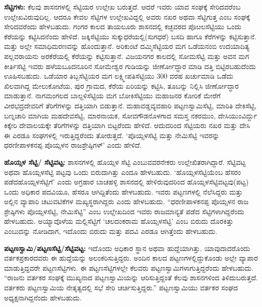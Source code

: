 \textbf{ಸೆಟ್ಟಿಗಳು:} ಕೆಲವು ಶಾಸನಗಳಲ್ಲಿ ಸೆಟ್ಟಿಯರ ಉಲ್ಲೇಖ ಬರುತ್ತದೆ. ಆದರೆ ಇವರು ಯಾವ ಸಂಘಕ್ಕೆ ಸೇರಿದವರೆಂಬ ಉಲ್ಲೇಖವಿರುವುದಿಲ್ಲ. ಆದರೂ ಕೇವಲ ಸೆಟ್ಟಿಗಳ ಉಲ್ಲೇಖವಿದ್ದಲ್ಲಿ ಅವರು ನಖರ ಅಥವಾ ಸೆಟ್ಟಿಗುತ್ತ ಎಂಬ ಸಂಘಕ್ಕೆ ಸೇರಿದವರೆಂದು ಹೇಳಬಹುದು. ಗಂಗರ ಕಾಲದ ತಾಯಲೂರು ಶಾಸನದಲ್ಲಿ ಕಚ್ಛವರದ ಪೊೞಲಸೆಟ್ಟಿಯು ಒಂದು ಕೆರೆಯನ್ನು ಕಟ್ಟಿಸಿದನೆಂದು ಹೇಳಿದೆ. ಜಕ್ಕಿಸೆಟ್ಟಿಯು ಸುಕ್ಕುಧರೆಯಲ್ಲಿ(ಸುಗಧರೆ) ಬಸದಿ ಹಾಗೂ ಕೆರೆಗಳನ್ನು ಕಟ್ಟಿಸುತ್ತಾನೆ. ಮತ್ತು ಅಲ್ಲೇ ಸಮಾಧಿಮರಣವನ್ನು ಹೊಂದುತ್ತಾನೆ. ಅರಿಕುಂಟೆ ದಮ್ಮಿಸೆಟ್ಟಿಯರ ಮಗ ಒಡೆಯನಂಬಿ ಉದಯಾದಿತ್ಯ ಪಲ್ಲವರಾಯನು ಅರಕೆರೆಯಲ್ಲಿ ಕೆರೆಯನ್ನು ಕಟ್ಟಿಸುತ್ತಾನೆ. ವಿಜಯನಗರ ಕಾಲದಲ್ಲಿ ಸೋಮಸೆಟ್ಟಿ ಮತ್ತು ಅವನ ಮಗ ಕೀರ್ತಿಸೆಟ್ಟಿ ಇವರು ಹಳೆಯಬೂದನೂರಿನ ಸೋಮೇಶ್ವರ ಗುಡಿಯನ್ನು ಜೀರ್ಣೋದ್ಧಾರ ಮಾಡಿ ದತ್ತಿ ಬಿಟ್ಟಿರಬಹುದೆಂದು ಊಹಿಸಬಹುದು. ಒಡೆಯಾರ ತಿಬ್ಬಸೆಟ್ಟಿಯರ ಮಗ ಲಕ್ಷ್ಮೀಪತಿಸೆಟ್ಟಿಯು 300 ವರಹ ಖರ್ಚುಮಾಡಿ ಒಡೆದು ಖಿಲವಾಗಿದ್ದ ಮೇಲುಕೋಟೆಯ, ಪುರ ಗ್ರಾಮದ, ಕೆರೆಯ ಏರಿಯನ್ನು ಕಟ್ಟಿಸಿ, ತೂಬನ್ನು ನಿಲ್ಲಿಸಿ ಜೀರ್ಣೋದ್ಧಾರ ಮಾಡುತ್ತಾನೆ. ನಾಗಮಂಗಲದ ಬಾಲ್ದಳಿಸೆಟ್ಟಿಯ ಮಗ ಬೋಕಿಸೆಟ್ಟಿಯು ಮಹಾಜನರ ಕೋರಿಕೆ ಮೇರೆಗೆ ವೀರಭದ್ರದೇವರಿಗೆ ತೆರಿಗೆಗಳನ್ನು ದತ್ತಿಯಾಗಿ ಬಿಡುತ್ತಾನೆ. ಮಹಾವಡ್ಡವ್ಯವಹಾರಿ ಪಟ್ಟಣಸ್ವಾಮಿಸೆಟ್ಟಿ, ಮಾರಿತಿ ದೇಕಿಸೆಟ್ಟಿ, ಬಣ್ನಚಾರಿ ಮಾಗಿಯ ಮಹದೇವಸೆಟ್ಟಿ, ಮಾರನಾಯಕ, ಸೋವಗೌಡನೊಳಗಾದ ಸಮಸ್ತ ನಕರಮುಂ, ದೇಸಿಯುಂವಿರ್ದ್ದು ಕಿಕ್ಕೇರಿ ದೇವಾಲಯಕ್ಕೇ ತೆರಿಗೆಗಳನ್ನು ದತ್ತಿಯಾಗಿ ಬಿಟ್ಟರೆಂದು ಹೇಳಿದೆ. ಆದುದರಿಂದ ಸೆಟ್ಟಿಯರು ನಖರ ಮತ್ತು ದೇಸಿ ಈ ಎರಡೂ ಸಂಘಗಳಲ್ಲಿ ಇರುತ್ತಿದ್ದರೆಂದು ತೋರುತ್ತದೆ. ‘ಪೊಯ್ಸಳಸೆಟ್ಟಿ ಮತ್ತು ನೇಮಿಸೆಟ್ಟಿ ಇವರನ್ನು ಧರಣೀಪಾಳಕನಪ್ಪ ಪೊಯ್ಸಳನ ರಾಜಶ್ರೇಷ್ಠಿಗಳ್​’ ಎಂದು ಹೇಳಿದೆ.

\textbf{ಹೊಯ್ಸಳ ಸೆಟ್ಟಿ/ ಸೆಟ್ಟಿವಟ್ಟ: } ಶಾಸನಗಳಲ್ಲಿ ಹೊಯ್ಸಳ ಸೆಟ್ಟಿ ಎಂಬುವವರನೇಕರು ಉಲ್ಲೇಖಿತರಾಗಿದ್ದಾರೆ. ಸೆಟ್ಟಿವಟ್ಟ ಅಥವಾ ಹೊಯ್ಸಳಸೆಟ್ಟಿ ಪಟ್ಟವು ಒಂದು ಬಿರುದಾಗಿತ್ತು ಎಂದೂ ಹೇಳಬಹುದು. ‘ಹೊಯ್ಸಳಸೆಟ್ಟಿಯೆಂಬ ಹೆಸರಂ ಪಡೆದ\break ಹೊಯ್ಸಳಸೆಟ್ಟಿಗೆ’ ಎಂದು ಅಗ್ರಹಾರ ಬಾಚಹಳ್ಳಿ ಶಾಸನದಲ್ಲಿ ಹೇಳಿರುವುದರಿಂದ ಹೊಯ್ಸಳಸೆಟ್ಟಿವಟ್ಟವು(ಪಟ್ಟ) ಒಂದು ಅಧಿಕಾರ ಪದವಿಯೂ, ಹೆಸರೂ ಆಗಿದ್ದಿತೆಂದು ಹೇಳಬಹುದು. ಇವರು ಪಟ್ಟಣಗಳಲ್ಲಿ ನೆಲೆಸಿದ್ದರು ಮತ್ತು ಅಲ್ಲಿನ ವ್ಯಾಪಾರಿ ಚಟುವಟಿಕೆಗಳ ಮಖ್ಯಸ್ಥರಾಗಿದ್ದರು ಎಂದು ಹೇಳಬಹುದು. “ಧರಣೀಪಾಳಕನಪ್ಪ ಪೊಯ್ಸಳನ ರಾಜ ಶ್ರೇಷ್ಠಿಗಳು ಪೊಯ್ಸಳಸೆಟ್ಟಿ, ನೇಮಿಸೆಟ್ಟಿ” ಎಂಬ ಉಲ್ಲೇಖದಿಂದ ಇವರು ರಾಜಮಾನ್ಯತೆ ಪಡೆದ ಸೆಟ್ಟಿಗಳಾಗಿದ್ದರೆಂದು ಹೇಳಬಹುದು. ಅಯ್ಯಾವೊಳೆಯ ಮಲ್ಲಿಸೆಟ್ಟಿಗೆ ‘ಚಲದಂಕರಾಮ ಹೊಯ್ಸಳಸೆಟ್ಟಿ’ ಎಂಬ ಬಿರುದು ದೊರಕಿತ್ತು ಎಂಬುದನ್ನು ನೋಡಿದಾಗ, ಇದೊಂದು ಬಿರುದು ಮತ್ತು ಪದವಿ ಎರಡೂ ಆಗಿತ್ತೆಂದು ಹೇಳಬಹುದು.

\textbf{ಪಟ್ಟಣಸ್ವಾಮಿ/ಪಟ್ಟಣಸೆಟ್ಟಿ/ಸೆಟ್ಟಿವಟ್ಟ: } ಇದೊಂದು ಅಧಿಕಾರ ಸ್ಥಾನ ಅಥವಾ ಹುದ್ದೆಯಾಗಿತ್ತು. ಯಾವುದಾದ\-ರೊಂದು ವರ್ತಕಪ್ರಕಾರದವರು ಈ ಹುದ್ದೆಯನ್ನು ಅಲಂಕರಿಸುತ್ತಿದ್ದರು. ಅಂದಿನ ಕಾಲದ ಪಟ್ಟಣಗಳಲ್ಲಿದ್ದುಕೊಂಡು ಅಲ್ಲೇ ವ್ಯಾಪಾರ ಮಾಡುತ್ತಿದ್ದವರೇ ಪಟ್ಟಣಸೆಟ್ಟಿಗಳು. ಈ ಪಟ್ಟಣಸೆಟ್ಟಿಗಳಲ್ಲೇ ಕೆಲವರು ಪಟ್ಟಣಸ್ವಾಮಿಗಳಾಗುತ್ತಿದ್ದರೆಂದು ಹೇಳಬಹುದು. “ರಾಜನು ವರ್ತಕರ ಸಂಘಕ್ಕೆ ಮುಖ್ಯನಾದ ಪಟ್ಟಣಸ್ವಾಮಿಯನ್ನು ಆರಿಸುತ್ತಿದ್ದಂತೆ ಕೆಲವು ಶಾಸನಗಳಿಂದ ತಿಳಿದುಬರುತ್ತದೆ. ವರ್ತಕರು ಪಟ್ಟಣಸ್ವಾಮಿಯ ನೇತೃತ್ವದಲ್ಲಿ ಸಭೆ ಸೇರಿ ಚರ್ಚಿಸುತ್ತಿದ್ದರು.” ಪಟ್ಟಣಸ್ವಾಮಿಯು ವರ್ತಕರ ಸಂಘದ ಅಧ್ಯಕ್ಷನಾಗಿದ್ದನೆಂದು ಹೇಳಬಹುದು.

